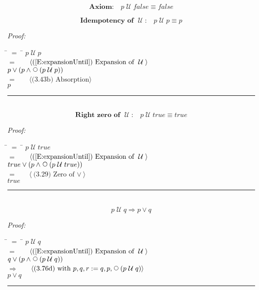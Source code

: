 \documentclass[fleqn, leqno]{article}
\newcommand{\lgap}{2pt} %
\newcommand{\mymathindent}{24pt} %
\newcommand{\Until}{\;\mathcal{U}\;}
\newcommand{\Next}{\;\,\text{\raisebox{3.5pt}{\circle{6}}}}
\newcommand{\myqed}{\hfill\rule[-.23ex]{1.2ex}{2.0ex}}
\newcommand{\spacer}{\vspace{-30pt}}
\newcommand{\Gll} {\langle} %
\newcommand{\Ggg} {\rangle} %
\newcommand{\Hint}[1] {\ \ \ $\Gll \mbox{#1} \Ggg$ } %
\begin{document}
\spacer

\begin{equation}\label{E:untilFalse}
\textbf{Axiom:}\quad p \Until false \equiv false
\end{equation}

\begin{equation}\label{E:idemUntil}
\textbf{Idempotency of $\Until$:}\quad p \Until p \equiv p
\end{equation}

\emph{Proof:}
\begin{tabbing}
\hspace{\mymathindent} \= $= \;$ \= \kill
\> \> $p \Until p$\\[\lgap]
\> $=$ \> \Hint{(\ref{E:expansionUntil}) Expansion of $\Until$}\\[\lgap]
\> \> $p \lor (p \land \Next(p \Until p))$\\[\lgap]
\> $=$ \> \Hint{(3.43b) Absorption}\\[\lgap]
\> \> $p$\\[\lgap]
\end{tabbing}
\myqed\\[\lgap]

\begin{equation}\label{E:zeroUntil}
\textbf{Right zero of $\Until$:}\quad p \Until true \equiv true
\end{equation}

\emph{Proof:}
\begin{tabbing}
\hspace{\mymathindent} \= $= \;$ \= \kill
\> \> $p \Until true$\\[\lgap]
\> $=$ \> \Hint{(\ref{E:expansionUntil}) Expansion of $\Until$}\\[\lgap]
\> \> $true \lor (p \land \Next(p \Until true))$\\[\lgap]
\> $=$ \> \Hint{(3.29) Zero of $\lor$}\\[\lgap]
\> \> $true$\\[\lgap]
\end{tabbing}
\myqed\\[\lgap]

\begin{equation}\label{E:untilImpOr}
p \Until q \Rightarrow p \lor q
\end{equation}

\emph{Proof:}
\begin{tabbing}
\hspace{\mymathindent} \= $= \;$ \= \kill
\> \> $p \Until q$\\[\lgap]
\> $=$ \> \Hint{(\ref{E:expansionUntil}) Expansion of $\Until$}\\[\lgap]
\> \> $q \lor (p \land \Next(p \Until q))$\\[\lgap]
\> $\Rightarrow$ \> \Hint{(3.76d) with $p,q,r := q,p,\Next(p \Until q)$}\\[\lgap]
\> \> $p \lor q$\\[\lgap]
\end{tabbing}
\myqed\\[\lgap]
\end{document}
